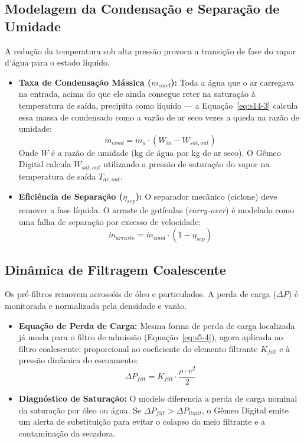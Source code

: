 \documentclass[12pt,a4paper]{article}
\numberwithin{equation}{section}
\numberwithin{table}{section}
\numberwithin{figure}{section}
\begin{document}
	\subsection{Modelagem da Condensação e Separação de Umidade}
	A redução da temperatura sob alta pressão provoca a transição de fase do vapor d'água para o estado líquido.
	\begin{itemize}
		\item \textbf{Taxa de Condensação Mássica ($\dot{m}_{cond}$):} Toda a água que o ar carregava na entrada, acima do que ele ainda consegue reter na saturação à temperatura de saída, precipita como líquido — a Equação~\eqref{eq:s14-3} calcula essa massa de condensado como a vazão de ar seco vezes a queda na razão de umidade:
		\begin{equation}\label{eq:s14-3}
 \dot{m}_{cond} = \dot{m}_a \cdot (W_{in} - W_{sat,out})
\end{equation}
		Onde $W$ é a razão de umidade (kg de água por kg de ar seco). O Gêmeo Digital calcula $W_{sat,out}$ utilizando a pressão de saturação do vapor na temperatura de saída $T_{ac,out}$.
		\item \textbf{Eficiência de Separação ($\eta_{sep}$):} O separador mecânico (ciclone) deve remover a fase líquida. O arraste de gotículas (\textit{carry-over}) é modelado como uma falha de separação por excesso de velocidade:
		\begin{equation}\label{eq:s14-4}
 \dot{m}_{arraste} = \dot{m}_{cond} \cdot (1 - \eta_{sep}) 
\end{equation}
	\end{itemize}
	
	\subsection{Dinâmica de Filtragem Coalescente}
	Os pré-filtros removem aerossóis de óleo e particulados. A perda de carga ($\Delta P$) é monitorada e normalizada pela densidade e vazão.
	\begin{itemize}
		\item \textbf{Equação de Perda de Carga:} Mesma forma de perda de carga localizada já usada para o filtro de admissão (Equação~\eqref{eq:s5-4}), agora aplicada ao filtro coalescente: proporcional ao coeficiente do elemento filtrante $K_{filt}$ e à pressão dinâmica do escoamento:
		\begin{equation}\label{eq:s14-5}
 \Delta P_{filt} = K_{filt} \cdot \frac{\rho \cdot v^2}{2}
\end{equation}
		\item \textbf{Diagnóstico de Saturação:} O modelo diferencia a perda de carga nominal da saturação por óleo ou água. Se $\Delta P_{filt} > \Delta P_{limit}$, o Gêmeo Digital emite um alerta de substituição para evitar o colapso do meio filtrante e a contaminação da secadora.
	\end{itemize}
	
\end{document}
